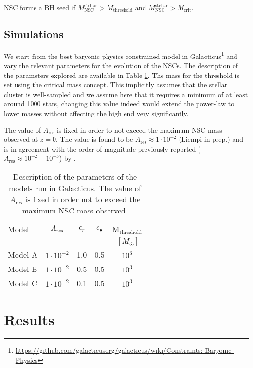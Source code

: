 \documentclass[baaa]{baaa}
\begin{document}
NSC forms a BH seed if  $M_\mathrm{NSC}^\mathrm{stellar}>M_\mathrm{threshold}$ and $M_\mathrm{NSC}^\mathrm{stellar} > M_\mathrm{crit}$.

\subsection{Simulations}

We start from the best baryonic physics constrained model in {\sc Galacticus}\footnote{\url{https://github.com/galacticusorg/galacticus/wiki/Constraints:-Baryonic-Physics}} and vary the relevant parameters for the evolution of the NSCs. The description of the parameters explored are available in Table \ref{tabla1}. The mass for the threshold is set using the critical mass concept. This implicitly assumes that the stellar cluster is well-sampled and we assume here that it requires a minimum of at least around 1000 stars, changing this value indeed would extend the power-law to lower masses without affecting the high end very significantly.

The value of $A_\mathrm{res}$ is fixed in order to not exceed the maximum NSC mass observed at $z=0$. The value is found to be $A_\mathrm{res}\approx 1\cdot 10^{-2}$ (Liempi in prep.) and is in agreement with the order of magnitude previously reported ($A_\mathrm{res}\approx 10^{-2}-10^{-3}$) by \cite{ANTONINI2015}.

\begin{table}[!t]
\centering
\caption{Description of the parameters of the models run in {\sc Galacticus}. The value of $A_\mathrm{res}$ is fixed in order not to exceed the maximum NSC mass observed. }
\begin{tabular}{lcccc}
\hline\hline\noalign{\smallskip}
\!\!Model & \!\!\!\!$A_\mathrm{res}$ & \!\!\!\! $\epsilon_r$ & \!\!\!\! $\epsilon_\bullet$\!\!\!\! &\!\!\!\!  M$_\mathrm{threshold}$ \\
& & & & $~[M_\odot]$\\
\hline\noalign{\smallskip}
\!\!Model A  & $1\cdot 10^{-2}$ & 1.0 & 0.5& $10^{3}$\\
\!\!Model B & $1\cdot 10^{-2}$  &  0.5& 0.5&$10^{3}$\\
\!\!Model C & $1\cdot 10^{-2}$   &  0.1& 0.5&$10^{3}$\\
\hline
\end{tabular}
\label{tabla1}
\end{table}

\section{Results}
\end{document}
